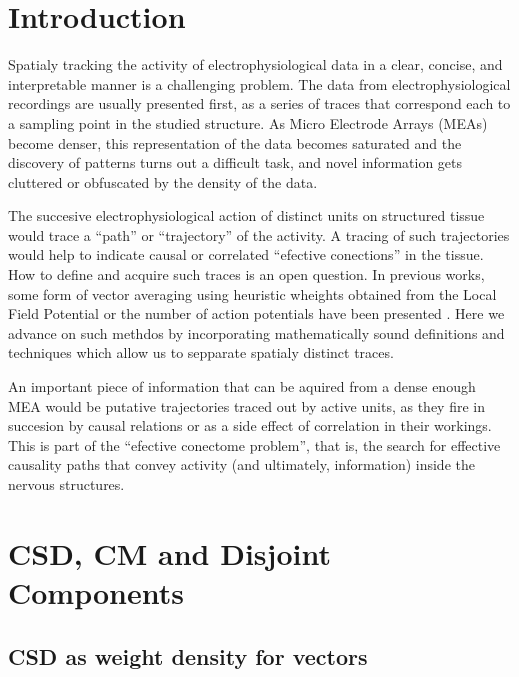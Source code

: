 \documentclass{article}
\begin{document}
\section{Introduction}

Spatialy tracking the activity of electrophysiological data in a clear, concise, and interpretable manner is a challenging problem. The data from electrophysiological recordings are usually presented first, as a series of traces that correspond each to a sampling point in the studied structure. As Micro Electrode Arrays (MEAs) become denser, this representation of the data becomes saturated and the discovery of patterns turns out a difficult task, and novel information gets cluttered or obfuscated by the density of the data.

The succesive electrophysiological action of distinct units on structured tissue would trace a ``path'' or ``trajectory'' of the activity. A tracing of such trajectories would help to indicate causal or correlated ``efective conections'' in the tissue. How to define and acquire such traces is an open question. In previous works, some form of vector averaging using heuristic wheights obtained from the Local Field Potential or the number of action potentials have been presented \cite{Chao05, Manjarrez07}. Here we advance on such methdos by incorporating mathematically sound definitions and techniques which allow us to sepparate spatialy distinct traces. 

An important piece of information that can be aquired from a dense enough MEA would be putative trajectories traced out by active units, as they fire in succesion by causal relations or as a side effect of correlation in their workings. This is part of the ``efective  conectome problem'', that is, the search for effective causality paths that convey activity (and ultimately, information) inside the nervous structures.  




\section{CSD, CM and Disjoint Components}

\subsection{CSD as weight density for vectors}
\end{document}
